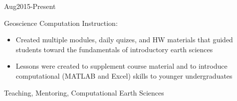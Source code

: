 \begin{experiences}
    {Aug2015-Present} {Geoscience Computation Instruction:
                      \begin{itemize}
                        \item Created multiple modules, daily quizes, and HW materials that guided students toward the fundamentals of introductory earth sciences
                        \item Lessons were created to supplement course material and to introduce computational (MATLAB and Excel) skills to younger undergraduates
                      \end{itemize}
                    }
                    {Teaching, Mentoring, Computational Earth Sciences}
  \emptySeparator  
\end{experiences}

